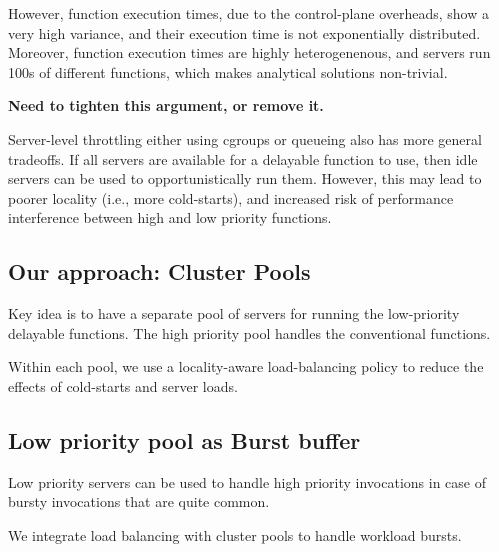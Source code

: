 However, function execution times, due to the control-plane overheads, show a very high variance, and their execution time is not exponentially distributed.
Moreover, function execution times are highly heterogenenous, and servers run 100s of different functions, which makes analytical solutions non-trivial. 

\textbf{Need to tighten this argument, or remove it.}

Server-level throttling either using cgroups or queueing also has more general tradeoffs. 
If all servers are available for a delayable function to use, then idle servers can be used to opportunistically run them. 
However, this may lead to poorer locality (i.e., more cold-starts), and increased risk of performance interference between high and low priority functions. 


\subsection{Our approach: Cluster Pools}

Key idea is to have a separate pool of servers for running the low-priority delayable functions. 
The high priority pool handles the conventional functions. 

Within each pool, we use a locality-aware load-balancing policy to reduce the effects of cold-starts and server loads. 

\subsection{Low priority pool as Burst buffer}

Low priority servers can be used to handle high priority invocations in case of bursty invocations that are quite common.

We integrate load balancing with cluster pools to handle workload bursts.

